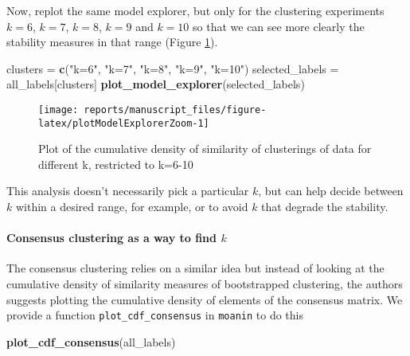 \documentclass[9pt,a4paper,]{extarticle}
\newenvironment{Shaded}{\begin{snugshade}}{\end{snugshade}}
\newcommand{\KeywordTok}[1]{\textcolor[rgb]{0.13,0.29,0.53}{\textbf{#1}}}
\newcommand{\NormalTok}[1]{#1}
\newcommand{\StringTok}[1]{\textcolor[rgb]{0.31,0.60,0.02}{#1}}
\begin{document}
Now, replot the same model explorer, but only for the clustering experiments
\(k=6\), \(k=7\), \(k=8\), \(k=9\) and \(k=10\) so that we can see more clearly the stability
measures in that range (Figure \ref{fig:plotModelExplorerZoom}).

\begin{Shaded}
\begin{Highlighting}[]
\NormalTok{clusters =}\StringTok{ }\KeywordTok{c}\NormalTok{(}\StringTok{"k=6"}\NormalTok{, }\StringTok{"k=7"}\NormalTok{, }\StringTok{"k=8"}\NormalTok{, }\StringTok{"k=9"}\NormalTok{, }\StringTok{"k=10"}\NormalTok{)}
\NormalTok{selected_labels =}\StringTok{ }\NormalTok{all_labels[clusters]}
\KeywordTok{plot_model_explorer}\NormalTok{(selected_labels)}
\end{Highlighting}
\end{Shaded}

\begin{figure}[H]

{\centering \texttt{[image: reports/manuscript\_files/figure-latex/plotModelExplorerZoom-1]} 

}

\caption{Plot of the cumulative density of similarity of clusterings of data for different k, restricted to k=6-10}\label{fig:plotModelExplorerZoom}
\end{figure}

This analysis doesn't necessarily pick a particular \(k\), but can help decide
between \(k\) within a desired range, for example, or to avoid \(k\) that degrade
the stability.

\hypertarget{consensus-clustering-as-a-way-to-find-k}{%
\paragraph{\texorpdfstring{Consensus clustering as a way to find \(k\)}{Consensus clustering as a way to find k}}\label{consensus-clustering-as-a-way-to-find-k}}

The consensus clustering \citep{monti:consensus} relies on a similar idea but
instead of looking at the cumulative density of similarity measures of
bootstrapped clustering, the authors suggests plotting the cumulative density
of elements of the consensus matrix. We provide a function
\texttt{plot\_cdf\_consensus} in \texttt{moanin} to do this

\begin{Shaded}
\begin{Highlighting}[]
\KeywordTok{plot_cdf_consensus}\NormalTok{(all_labels)}
\end{Highlighting}
\end{Shaded}
\end{document}
